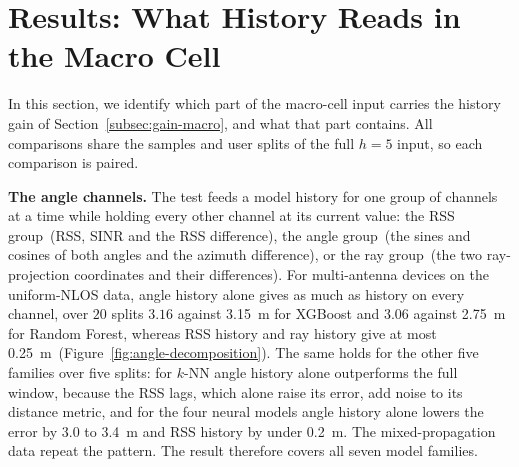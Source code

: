 \section{Results: What History Reads in the Macro Cell}
\label{sec:results-mechanism}

In this section, we identify which part of the macro-cell input carries the history gain of Section~\ref{subsec:gain-macro}, and what that part contains. All comparisons share the samples and user splits of the full $h=5$ input, so each comparison is paired.

\noindent\textbf{The angle channels.} The test feeds a model history for one group of channels at a time while holding every other channel at its current value: the RSS group~(RSS, SINR and the RSS difference), the angle group~(the sines and cosines of both angles and the azimuth difference), or the ray group~(the two ray-projection coordinates and their differences). For multi-antenna devices on the uniform-NLOS data, angle history alone gives as much as history on every channel, over $20$ splits $3.16$ against \SI{3.15}{\meter} for XGBoost and $3.06$ against \SI{2.75}{\meter} for Random Forest, whereas RSS history and ray history give at most \SI{0.25}{\meter}~(Figure~\ref{fig:angle-decomposition}). The same holds for the other five families over five splits: for $k$-NN angle history alone outperforms the full window, because the RSS lags, which alone raise its error, add noise to its distance metric, and for the four neural models angle history alone lowers the error by $3.0$ to \SI{3.4}{\meter} and RSS history by under \SI{0.2}{\meter}. The mixed-propagation data repeat the pattern. The result therefore covers all seven model families.

